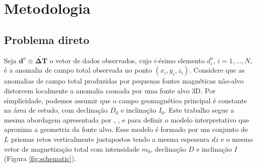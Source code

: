 \chapter{Metodologia}

\section{Problema direto}

Seja $\mathbf{d}^{o}\equiv \tilde{\boldsymbol{\Delta}\mathbf{T}}$ o vetor de dados observados, cujo $i$-ésimo elemento $d^{o}_{i}$, $i = 1, \dots, N$, é a anomalia de campo total observada no ponto $(x_{i}, y_{i}, z_{i})$.
Considere que as anomalias de campo total produzidas por pequenas fontes magnéticas não-alvo distorcem localmente a anomalia causada por uma fonte alvo 3D.
Por simplicidade, podemos assumir que o campo geomagnético principal é constante na área de estudo, com declinação $ D_ {0} $ e inclinação $ I_ {0} $.
Este trabalho segue a mesma abordagem apresentada por \cite{oliveirajr_etal2011}, \cite{oliveirajr_barbosa2013}, e \cite{vital_etal2019} para definir o modelo interpretativo que aproxima a geometria da fonte alvo.
Esse modelo é formado por um conjunto de $L$ prismas retos verticalmente justapostos tendo a mesma espessura $dz$ e o mesmo vetor de magnetização total com intensidade $m_{0}$, declinação $D$ e inclinação $I$ (Figura \ref{fig:schematic}).


